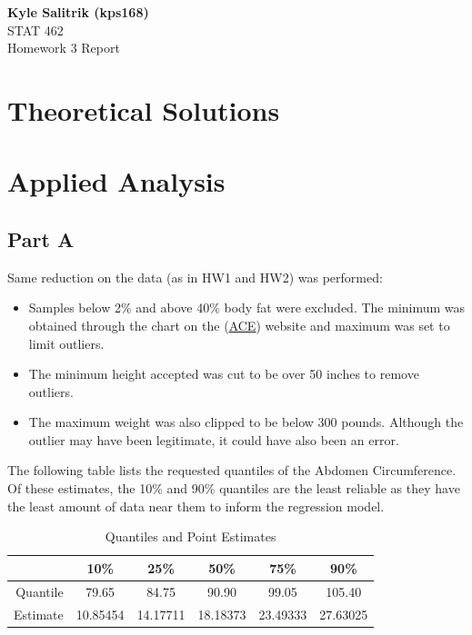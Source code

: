\documentclass[a4paper, 11pt]{article}
\begin{document}
\graphicspath{{./figures/}}
\noindent
\large\textbf{Kyle Salitrik (kps168)} \\
\normalsize STAT 462\\
\large{Homework 3 Report} \hfill 



\section*{Theoretical Solutions}




\section*{Applied Analysis}
\subsection*{Part A}
Same reduction on the data (as in HW1 and HW2) was performed:
\begin{itemize}
	\item Samples below 2\% and above 40\% body fat were excluded. The minimum was obtained through the chart on the (\href{''https://www.acefitness.org/acefit/healthy-living-article/60/112/what-are-the-guidelines-for-percentage-of-body-fat-loss''}{\underline{ACE}}) website and maximum was set to limit outliers.
	\item The minimum height accepted was cut to be over 50 inches to remove outliers.
	\item The maximum weight was also clipped to be below 300 pounds. Although the outlier may have been legitimate, it could have also been an error.
\end{itemize}

The following table lists the requested quantiles of the Abdomen Circumference. Of these estimates, the 10\% and 90\% quantiles are the least reliable as they have the least amount of data near them to inform the regression model.
\begin{table}[H]
	\centering
	\begin{tabular}{r | c | c | c | c | c}
	   & 10\% & 25\% & 50\% & 75\% & 90\% \\ \hline
	 Quantile & 79.65 &  84.75  & 90.90  & 99.05 & 105.40 \\
	 Estimate &10.85454 & 14.17711 &  18.18373 &  23.49333 &  27.63025 
	\end{tabular}
	\caption{Quantiles and Point Estimates}
	\label{table:points}
\end{table}
\end{document}
